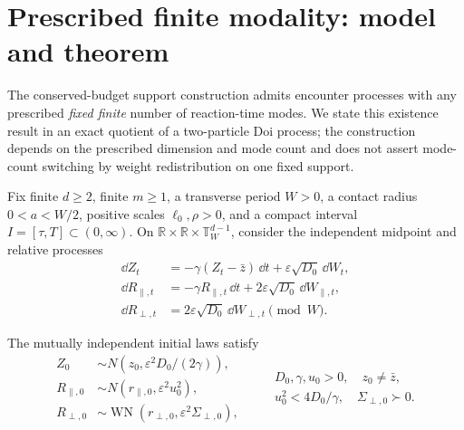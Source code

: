 
\section{Prescribed finite modality: model and theorem}
\label{sec:exact-m-spine}

The conserved-budget support construction admits encounter processes with any
prescribed \emph{fixed finite} number of reaction-time modes.  We state this
existence result in an exact quotient of a two-particle Doi process; the
construction depends on the prescribed dimension and mode count and does not
assert mode-count switching by weight redistribution on one fixed support.

Fix finite $d\ge2$, finite $m\ge1$, a transverse period $W>0$, a contact
radius $0<a<W/2$, positive scales $\ell_0,\rho>0$, and a compact interval
$I=[\tau,T]\subset(0,\infty)$.
On $\mathbb R\times\mathbb R\times\mathbb T_W^{d-1}$, consider the
independent midpoint and relative processes
\begin{equation}
 \begin{aligned}
 \dd Z_t&=-\gamma(Z_t-\bar z)\,\dd t
       +\varepsilon\sqrt{D_0}\,\dd W_t,\\
 \dd R_{\parallel,t}&=-\gamma R_{\parallel,t}\,\dd t
       +2\varepsilon\sqrt{D_0}\,\dd W_{\parallel,t},\\
 \dd R_{\perp,t}&=2\varepsilon\sqrt{D_0}\,\dd W_{\perp,t}\pmod W.
 \end{aligned}
 \label{eq:exact-m-process}
\end{equation}

The mutually independent initial laws satisfy
\begin{equation}
 \begin{aligned}
 Z_0&\sim N\!\left(z_0,\varepsilon^2D_0/(2\gamma)\right),\\
 R_{\parallel,0}&\sim N(r_{\parallel,0},\varepsilon^2u_0^2),\\
 R_{\perp,0}&\sim
 \operatorname{WN}(r_{\perp,0},\varepsilon^2\Sigma_{\perp,0}),
 \end{aligned}
 \qquad
 \begin{gathered}
 D_0,\gamma,u_0>0,\quad z_0\ne\bar z,\\
 u_0^2<4D_0/\gamma,\quad \Sigma_{\perp,0}\succ0.
 \end{gathered}
 \label{eq:exact-m-initial}
\end{equation}

